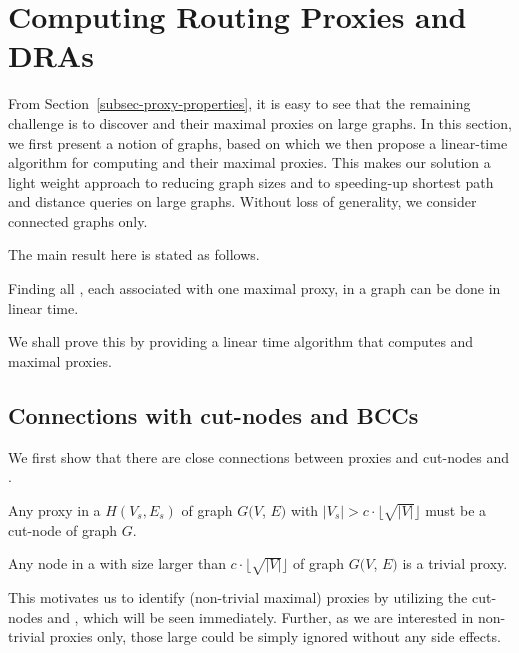 \section{Computing Routing Proxies and DRAs}
\label{sec-proxy-algorithms}
From Section~\ref{subsec-proxy-properties}, it is easy to see that the remaining challenge is to discover \dras and their maximal proxies on large graphs.
In this section, we first present a notion of  \bcsketch graphs, based on which we then propose a linear-time algorithm  for computing \dras and their maximal proxies. This makes our solution a light weight approach to reducing graph sizes and to  speeding-up shortest  path and distance queries on large graphs. Without loss of generality, we consider connected graphs only.



The main result here is stated as follows.

\begin{theorem}
\label{thm-compute-dras} Finding all \dras, each associated with one maximal proxy, in a graph can be done in linear time.
\end{theorem}


We shall prove this by providing a linear time algorithm that computes \dras and maximal proxies.


\subsection{Connections with cut-nodes and BCCs}
\label{subsec-connections}

We first show that there are close connections between proxies and cut-nodes and \bccs.



\begin{prop}
\label{prop-proxy-cut} Any proxy in a \cc $H(V_s, E_s)$ of graph $G(V$, $E)$ with $|V_s|>c\cdot\lfloor\sqrt{|V|}\rfloor$ must be a cut-node of graph $G$.
\end{prop}



\begin{prop}
\label{prop-large-bcc} Any node in a \bc with size larger than $c\cdot\lfloor\sqrt{|V|}\rfloor$ of graph $G(V$, $E)$ is a trivial proxy.
\end{prop}


This motivates us to identify (non-trivial maximal) proxies by utilizing the cut-nodes and \bccs, which will be seen immediately.
Further, as we are interested in non-trivial proxies only, those large \bccs could be simply ignored without any side effects.

